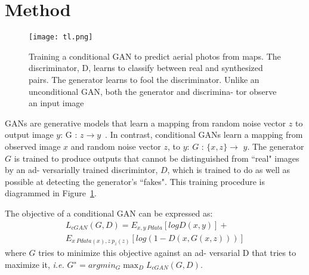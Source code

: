 \documentclass[10pt,twocolumn,letterpaper]{article}
\begin{document}
\section{Method}
\begin{figure}[htbp]
 \texttt{[image: tl.png]}\\
 \caption{Training a conditional GAN to predict aerial photos from
maps. The discriminator, D, learns to classify between real and
synthesized pairs. The generator learns to fool the discriminator.
Unlike an unconditional GAN, both the generator and discrimina-
tor observe an input image}\label{Figure2}
 \end{figure}
GANs are generative models that learn a mapping from
random noise vector $z$ to output image $y$: G : $z\to{y}$~\cite{name14}. In contrast, conditional GANs learn a mapping from
observed image $x$ and random noise vector $z$, to $y$: $G$ :
$\{x, z\} \to$ $y$. The generator $G$ is trained to produce outputs
that cannot be distinguished from ``real" images by an ad-
versarially trained discrimintor, $D$, which is trained to do as
well as possible at detecting the generator’s ``fakes". This
training procedure is diagrammed in Figure~\ref{Figure2}.
\par The objective of a conditional GAN can be expressed as:
\begin{equation}
\begin{split}
L_{cGAN}(G,D)=E_{x,y~Pdata}[logD(x,y)]+\\E_{x~Pdata(x),z~p_z(z)}[log(1-D(x,G(x,z)))]
\end{split}
\end{equation}
where $G$ tries to minimize this objective against an ad-
versarial D that tries to maximize it, \emph{i.e.} $G^∗=
argmin_{G}\max_{D}L_{cGAN}(G, D)$.


\end{document}
